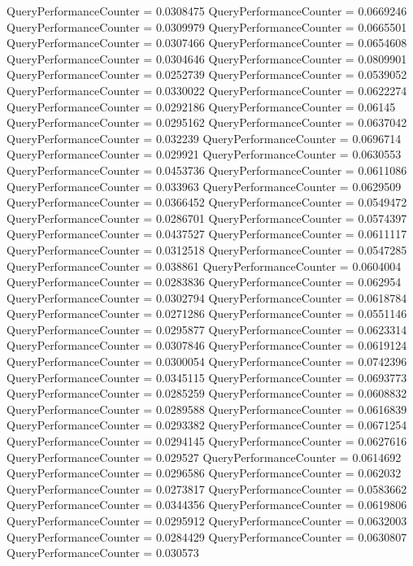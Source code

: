 \documentclass[9pt]{article}
\theoremstyle{plain}
\theoremstyle{definition}
\theoremstyle{remark}
\numberwithin{equation}{section}
\begin{document}
QueryPerformanceCounter  =  0.0308475
QueryPerformanceCounter  =  0.0669246
QueryPerformanceCounter  =  0.0309979
QueryPerformanceCounter  =  0.0665501
QueryPerformanceCounter  =  0.0307466
QueryPerformanceCounter  =  0.0654608
QueryPerformanceCounter  =  0.0304646
QueryPerformanceCounter  =  0.0809901
QueryPerformanceCounter  =  0.0252739
QueryPerformanceCounter  =  0.0539052
QueryPerformanceCounter  =  0.0330022
QueryPerformanceCounter  =  0.0622274
QueryPerformanceCounter  =  0.0292186
QueryPerformanceCounter  =  0.06145
QueryPerformanceCounter  =  0.0295162
QueryPerformanceCounter  =  0.0637042
QueryPerformanceCounter  =  0.032239
QueryPerformanceCounter  =  0.0696714
QueryPerformanceCounter  =  0.029921
QueryPerformanceCounter  =  0.0630553
QueryPerformanceCounter  =  0.0453736
QueryPerformanceCounter  =  0.0611086
QueryPerformanceCounter  =  0.033963
QueryPerformanceCounter  =  0.0629509
QueryPerformanceCounter  =  0.0366452
QueryPerformanceCounter  =  0.0549472
QueryPerformanceCounter  =  0.0286701
QueryPerformanceCounter  =  0.0574397
QueryPerformanceCounter  =  0.0437527
QueryPerformanceCounter  =  0.0611117
QueryPerformanceCounter  =  0.0312518
QueryPerformanceCounter  =  0.0547285
QueryPerformanceCounter  =  0.038861
QueryPerformanceCounter  =  0.0604004
QueryPerformanceCounter  =  0.0283836
QueryPerformanceCounter  =  0.062954
QueryPerformanceCounter  =  0.0302794
QueryPerformanceCounter  =  0.0618784
QueryPerformanceCounter  =  0.0271286
QueryPerformanceCounter  =  0.0551146
QueryPerformanceCounter  =  0.0295877
QueryPerformanceCounter  =  0.0623314
QueryPerformanceCounter  =  0.0307846
QueryPerformanceCounter  =  0.0619124
QueryPerformanceCounter  =  0.0300054
QueryPerformanceCounter  =  0.0742396
QueryPerformanceCounter  =  0.0345115
QueryPerformanceCounter  =  0.0693773
QueryPerformanceCounter  =  0.0285259
QueryPerformanceCounter  =  0.0608832
QueryPerformanceCounter  =  0.0289588
QueryPerformanceCounter  =  0.0616839
QueryPerformanceCounter  =  0.0293382
QueryPerformanceCounter  =  0.0671254
QueryPerformanceCounter  =  0.0294145
QueryPerformanceCounter  =  0.0627616
QueryPerformanceCounter  =  0.029527
QueryPerformanceCounter  =  0.0614692
QueryPerformanceCounter  =  0.0296586
QueryPerformanceCounter  =  0.062032
QueryPerformanceCounter  =  0.0273817
QueryPerformanceCounter  =  0.0583662
QueryPerformanceCounter  =  0.0344356
QueryPerformanceCounter  =  0.0619806
QueryPerformanceCounter  =  0.0295912
QueryPerformanceCounter  =  0.0632003
QueryPerformanceCounter  =  0.0284429
QueryPerformanceCounter  =  0.0630807
QueryPerformanceCounter  =  0.030573
\end{document}
